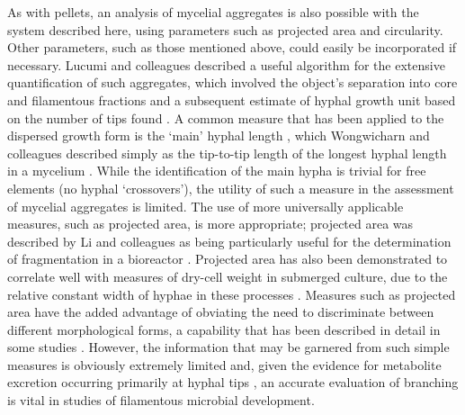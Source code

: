 As with pellets, an analysis of mycelial aggregates is also possible with the system described here, using parameters such as projected area and circularity. Other parameters, such as those mentioned above, could easily be incorporated if necessary. Lucumi and colleagues described a useful algorithm for the extensive quantification of such aggregates, which involved the object's separation into core and filamentous fractions and a subsequent estimate of hyphal growth unit based on the number of tips found \cite{lucumi2005}. A common measure that has been applied to the dispersed growth form is the \lq main' hyphal length \cite{tucker1992}, which Wongwicharn and colleagues described simply as the tip-to-tip length of the longest hyphal length in a mycelium \cite{wongwicharn1999a}. While the identification of the main hypha is trivial for free elements (no hyphal \lq crossovers'), the utility of such a measure in the assessment of mycelial aggregates is limited. The use of more universally applicable measures, such as projected area, is more appropriate; projected area was described by Li and colleagues as being particularly useful for the determination of fragmentation in a bioreactor \cite{li2002}. Projected area has also been demonstrated to correlate well with measures of dry-cell weight in submerged culture, due to the relative constant width of hyphae in these processes \cite{carlsen1996a,spohr1997}. Measures such as projected area have the added advantage of obviating the need to discriminate between different morphological forms, a capability that has been described in detail in some studies \cite{tucker1992,papagianni2006a}. However, the information that may be garnered from such simple measures is obviously extremely limited and, given the evidence for metabolite excretion occurring primarily at hyphal tips \cite{wosten1991,amanullah2002,muller2002}, an accurate evaluation of branching is vital in studies of filamentous microbial development. 

